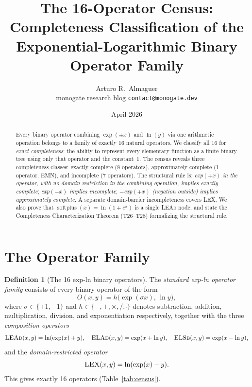 \documentclass[12pt,a4paper]{article}
\title{The 16-Operator Census: Completeness Classification of the\\
Exponential-Logarithmic Binary Operator Family}
\author{Arturo R.\ Almaguer\\
\small monogate research blog \quad \texttt{contact@monogate.dev}}
\date{April 2026}
\theoremstyle{definition}
\newtheorem{definition}[theorem]{Definition}
\begin{document}
\maketitle
\tableofcontents

\begin{abstract}
Every binary operator combining $\exp(\pm x)$ and $\ln(y)$ via one arithmetic
operation belongs to a family of exactly 16 natural operators. We classify all
16 for \emph{exact completeness}: the ability to represent every elementary
function as a finite binary tree using only that operator and the constant~$1$.
The census reveals three completeness classes: exactly complete (8 operators),
approximately complete (1 operator, EMN), and incomplete (7 operators).
The structural rule is: \emph{exp$(+x)$ in the operator, with no domain restriction
in the combining operation, implies exactly complete}; \emph{exp$(-x)$
implies incomplete}; \emph{$-$exp$(+x)$ (negation outside) implies
approximately complete}. A separate domain-barrier incompleteness covers LEX.
We also prove that $\operatorname{softplus}(x) = \ln(1+e^x)$ is a single
\textsc{LEAd} node, and state the Completeness Characterization Theorem (T26--T28)
formalizing the structural rule.
\end{abstract}

\section{The Operator Family}

\begin{definition}[The 16 exp-ln binary operators]\label{def:16ops}
The \emph{standard exp-ln operator family} consists of every binary operator of
the form
\[
  O(x,y) = h\!\bigl(\exp(\sigma x),\, \ln y\bigr),
\]
where $\sigma\in\{+1,-1\}$ and $h\in\{-,+,\times,/,\,\hat{}\}$ denotes
subtraction, addition, multiplication, division, and exponentiation respectively,
together with the three \emph{composition operators}
\[
  \textsc{LEAd}(x,y) = \ln(\exp(x)+y),\quad
  \textsc{ELAd}(x,y) = \exp(x+\ln y),\quad
  \textsc{ELSb}(x,y) = \exp(x-\ln y),
\]
and the \emph{domain-restricted operator}
\[
  \textsc{LEX}(x,y) = \ln(\exp(x)-y).
\]
This gives exactly 16 operators (Table~\ref{tab:census}).
\end{definition}
\end{document}
